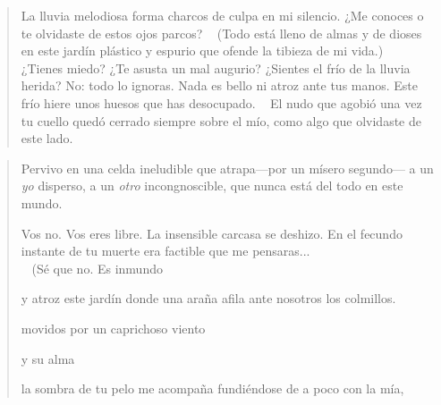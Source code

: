 \documentclass[a4paper, 12pt]{article}
\begin{document}
\pagebreak 


\begin{verse}
    
La lluvia melodiosa forma charcos 
de culpa en mi silencio. ¿Me conoces
o te olvidaste de estos ojos parcos?
~
(Todo está lleno de almas y de dioses
en este jardín plástico y espurio
que ofende la tibieza de mi vida.)
~
¿Tienes miedo? ¿Te asusta un mal augurio?
¿Sientes el frío de la lluvia herida?
No: todo lo ignoras. Nada es bello
ni atroz ante tus manos. Este frío 
hiere unos huesos que has desocupado.
~
El nudo que agobió una vez tu cuello
quedó cerrado siempre sobre el mío,
como algo que olvidaste de este lado.
~
\end{verse}




\pagebreak 

\begin{verse}

Pervivo en una celda ineludible
que atrapa---por un mísero segundo---
a un \textit{yo} disperso, a un \textit{otro} incongnoscible,
que nunca está del todo en este mundo.

Vos no. Vos eres libre. La insensible
carcasa se deshizo. En el fecundo
instante de tu muerte era factible
que me pensaras...
~ ~ ~ ~ ~ ~ ~ ~ ~ ~ ~ ~ ~  (Sé que no. Es inmundo 

y atroz este jardín donde una araña 
afila ante nosotros los colmillos. 

movidos por un caprichoso viento 






y su alma 



la sombra de tu pelo me acompaña 
fundiéndose de a poco con la mía,




\end{verse}
\end{document}

